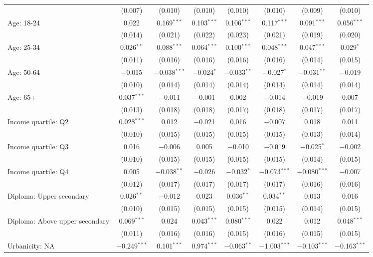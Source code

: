 \begin{tabular}{@{\extracolsep{5pt}}lccccccc}
  & (0.007) & (0.010) & (0.010) & (0.010) & (0.010) & (0.009) & (0.010) \\ 
  Age: 18\mbox{-}24 & 0.022 & 0.169$^{***}$ & 0.103$^{***}$ & 0.106$^{***}$ & 0.117$^{***}$ & 0.091$^{***}$ & 0.056$^{***}$ \\ 
  & (0.014) & (0.021) & (0.022) & (0.023) & (0.021) & (0.019) & (0.020) \\ 
  Age: 25\mbox{-}34 & 0.026$^{**}$ & 0.088$^{***}$ & 0.064$^{***}$ & 0.100$^{***}$ & 0.048$^{***}$ & 0.047$^{***}$ & 0.029$^{*}$ \\ 
  & (0.011) & (0.016) & (0.016) & (0.016) & (0.016) & (0.014) & (0.015) \\ 
  Age: 50\mbox{-}64 & $-$0.015 & $-$0.038$^{***}$ & $-$0.024$^{*}$ & $-$0.033$^{**}$ & $-$0.027$^{*}$ & $-$0.031$^{**}$ & $-$0.019 \\ 
  & (0.010) & (0.014) & (0.014) & (0.014) & (0.014) & (0.014) & (0.014) \\ 
  Age: 65+ & 0.037$^{***}$ & $-$0.011 & $-$0.001 & 0.002 & $-$0.014 & $-$0.019 & 0.007 \\ 
  & (0.013) & (0.018) & (0.018) & (0.017) & (0.018) & (0.017) & (0.017) \\ 
  Income quartile: Q2 & 0.028$^{***}$ & 0.012 & $-$0.021 & 0.016 & $-$0.007 & 0.018 & 0.011 \\ 
  & (0.010) & (0.015) & (0.015) & (0.015) & (0.015) & (0.013) & (0.014) \\ 
  Income quartile: Q3 & 0.016 & $-$0.006 & 0.005 & $-$0.010 & $-$0.019 & $-$0.025$^{*}$ & $-$0.002 \\ 
  & (0.010) & (0.015) & (0.015) & (0.015) & (0.015) & (0.014) & (0.015) \\ 
  Income quartile: Q4 & 0.005 & $-$0.038$^{**}$ & $-$0.026 & $-$0.032$^{*}$ & $-$0.073$^{***}$ & $-$0.080$^{***}$ & $-$0.007 \\ 
  & (0.012) & (0.017) & (0.017) & (0.017) & (0.017) & (0.016) & (0.016) \\ 
  Diploma: Upper secondary & 0.026$^{**}$ & $-$0.012 & 0.023 & 0.036$^{**}$ & 0.034$^{**}$ & 0.013 & 0.016 \\ 
  & (0.010) & (0.015) & (0.015) & (0.015) & (0.015) & (0.014) & (0.015) \\ 
  Diploma: Above upper secondary & 0.069$^{***}$ & 0.024 & 0.043$^{***}$ & 0.080$^{***}$ & 0.022 & 0.012 & 0.048$^{***}$ \\ 
  & (0.011) & (0.016) & (0.016) & (0.015) & (0.016) & (0.015) & (0.015) \\ 
  Urbanicity: NA & $-$0.249$^{***}$ & 0.101$^{***}$ & 0.974$^{***}$ & $-$0.063$^{**}$ & $-$1.003$^{***}$ & $-$0.103$^{***}$ & $-$0.163$^{***}$ \\ 

\end{tabular}
